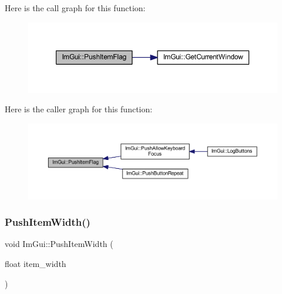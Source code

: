 Here is the call graph for this function\+:
\nopagebreak
\begin{figure}[H]
\begin{center}
\leavevmode
\includegraphics[width=350pt]{namespace_im_gui_ac7301f6378333f6d17f47823eed9e00a_cgraph}
\end{center}
\end{figure}
Here is the caller graph for this function\+:
\nopagebreak
\begin{figure}[H]
\begin{center}
\leavevmode
\includegraphics[width=350pt]{namespace_im_gui_ac7301f6378333f6d17f47823eed9e00a_icgraph}
\end{center}
\end{figure}
\mbox{\label{namespace_im_gui_a4ad13bf38f0521a339133248ef3e3036}} 
\subsubsection{\texorpdfstring{Push\+Item\+Width()}{PushItemWidth()}}
{\footnotesize\ttfamily void Im\+Gui\+::\+Push\+Item\+Width (\begin{DoxyParamCaption}\item[{float}]{item\+\_\+width }\end{DoxyParamCaption})}

